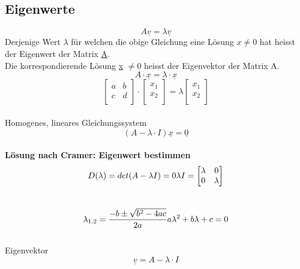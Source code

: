 \subsection{Eigenwerte}
\[
	A\underline{v} = \lambda \underline{v}
\]
Derjenige Wert $\lambda$ für welchen die obige Gleichung eine Lösung $x\neq 0$ hat heisst der Eigenwert der Matrix \underline{A}. 
\\Die korrespondierende Lösung \underline{x} $\neq 0$ heisst der Eigenvektor der Matrix A.
\\
\[
	A \cdot \underline{x }=\lambda \cdot \underline{x}
\]
\[
		\begin{bmatrix}
			a & b  \\
			c & d  \\
		\end{bmatrix}
		\cdot	
		\begin{bmatrix}
				x_1 \\
				x_2 \\
		\end{bmatrix}
		=
		\lambda
		\begin{bmatrix}
				x_1 \\
				x_2 \\
		\end{bmatrix}
\]
\\
Homogenes, lineares Gleichungssystem
\[
	(A-\lambda\cdot I) \underline{x} = \underline{0}
\]
\\
\textbf{Lösung nach Cramer: Eigenwert bestimmen}
\[
		D(\lambda)=det(A-\lambda I)= 0	\\	\lambda I = \begin{bmatrix}
			\lambda & 0  \\
			0 & \lambda  \\
		\end{bmatrix}
\]
\\
\[
		\lambda_{1,2}=\frac{-b\pm \sqrt{b^2-4ac}}{2a}	\\	a	\lambda^2+b	\lambda+c=0
\]
\\
Eigenvektor
\[
		\underline{v}= A - \lambda \cdot I 
\]